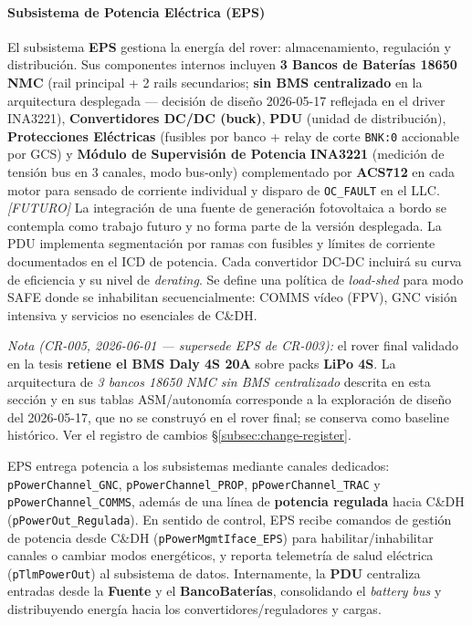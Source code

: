 \paragraph{Subsistema de Potencia Eléctrica (EPS)}
El subsistema \textbf{EPS} gestiona la energía del rover: almacenamiento, regulación y distribución. Sus componentes internos incluyen \textbf{3 Bancos de Baterías 18650 NMC} (rail principal + 2 rails secundarios; \textbf{sin BMS centralizado} en la arquitectura desplegada --- decisión de diseño 2026-05-17 reflejada en el driver INA3221), \textbf{Convertidores DC/DC (buck)}, \textbf{PDU} (unidad de distribución), \textbf{Protecciones Eléctricas} (fusibles por banco + relay de corte \texttt{BNK:0} accionable por GCS) y \textbf{Módulo de Supervisión de Potencia} \textbf{INA3221} (medición de tensión bus en 3 canales, modo bus-only) complementado por \textbf{ACS712} en cada motor para sensado de corriente individual y disparo de \texttt{OC\_FAULT} en el LLC. \textit{[FUTURO]} La integración de una fuente de generación fotovoltaica a bordo se contempla como trabajo futuro y no forma parte de la versión desplegada. La PDU implementa segmentación por ramas con fusibles y límites de corriente documentados en el ICD de potencia. Cada convertidor DC-DC incluirá su curva de eficiencia y su nivel de \emph{derating}. Se define una política de \emph{load-shed} para modo SAFE donde se inhabilitan secuencialmente: COMMS vídeo (FPV), GNC visión intensiva y servicios no esenciales de C\&DH.

\emph{Nota (CR-005, 2026-06-01 — supersede EPS de CR-003):} el rover final validado en la tesis \textbf{retiene el BMS Daly 4S 20A} sobre packs \textbf{LiPo 4S}. La arquitectura de \emph{3 bancos 18650 NMC sin BMS centralizado} descrita en esta sección y en sus tablas ASM/autonomía corresponde a la exploración de diseño del 2026-05-17, que no se construyó en el rover final; se conserva como baseline histórico. Ver el registro de cambios \S\ref{subsec:change-register}.

EPS entrega potencia a los subsistemas mediante canales dedicados: \texttt{pPowerChannel\_GNC}, \texttt{pPowerChannel\_PROP}, \texttt{pPowerChannel\_TRAC} y \texttt{pPowerChannel\_COMMS}, además de una línea de \textbf{potencia regulada} hacia C\&DH (\texttt{pPowerOut\_Regulada}). En sentido de control, EPS recibe comandos de gestión de potencia desde C\&DH (\texttt{pPowerMgmtIface\_EPS}) para habilitar/inhabilitar canales o cambiar modos energéticos, y reporta telemetría de salud eléctrica (\texttt{pTlmPowerOut}) al subsistema de datos. Internamente, la \textbf{PDU} centraliza entradas desde la \textbf{Fuente} y el \textbf{BancoBaterías}, consolidando el \textit{battery bus} y distribuyendo energía hacia los convertidores/reguladores y cargas.

